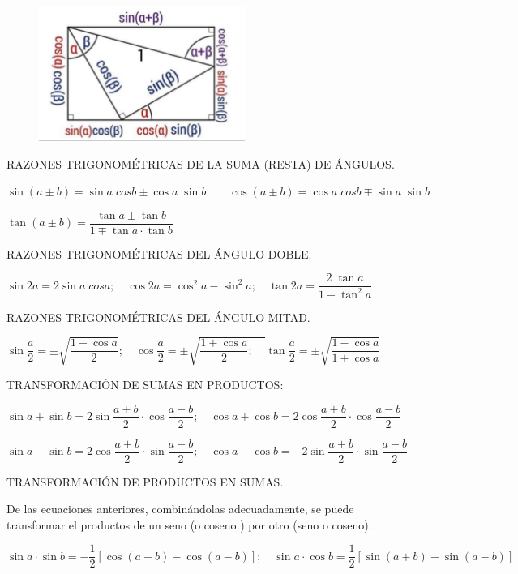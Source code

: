 	\begin{figure}[H]
		\centering
		\includegraphics[width=0.6\textwidth]{imagenes/apendices/APENDICESIM10.png}
	\end{figure}



	RAZONES TRIGONOMÉTRICAS DE LA SUMA (RESTA) DE ÁNGULOS.
	
	$\sin(a \pm b)=\sin a \; cos b \pm \cos a \; \sin b \qquad \cos(a \pm b)= \cos a \; cos b \mp \sin a \; \sin b$
	
	$\tan (a\pm b) = \dfrac {\tan a \pm \tan b}{1 \mp \tan a \cdot \tan b}$
	
	RAZONES TRIGONOMÉTRICAS DEL ÁNGULO DOBLE.
	
	$\sin 2a = 2 \sin a \; cos a ; \quad \cos 2a =\cos^2 a - \sin^2 a ; \quad \tan 2a = \dfrac {2 \; \tan a}{1-\tan^2 a}$
	
	RAZONES TRIGONOMÉTRICAS DEL ÁNGULO MITAD.
	
	$\sin \dfrac a 2 = \pm \sqrt{ \dfrac {1-\cos a}{2}} ; \quad \cos \dfrac a 2 = \pm \sqrt{ \dfrac {1+\cos a}{2} ; \quad }\tan \dfrac a 2 = \pm \sqrt{\dfrac {1-\cos a}{1+\cos a}}$
	
	TRANSFORMACIÓN DE SUMAS EN PRODUCTOS:
	
	$\sin a + \sin b = 2 \sin \dfrac {a+b}{2}\cdot \cos \dfrac {a-b}{2}  ; 	\quad  \cos a + \cos b = 2 \cos \dfrac {a+b}{2}\cdot \cos \dfrac {a-b}{2}$
	
	$\sin a - \sin b = 2 \cos \dfrac {a+b}{2}\cdot \sin \dfrac {a-b}{2}  ; 	\quad  \cos a - \cos b = -2 \sin \dfrac {a+b}{2}\cdot \sin \dfrac {a-b}{2}$
	
	TRANSFORMACIÓN DE PRODUCTOS EN SUMAS.
	
	De las ecuaciones anteriores, combinándolas adecuadamente, se puede transformar el productos de un seno (o coseno ) por otro (seno o coseno).
	
	$\sin a \cdot \sin b= -\dfrac 1 2 [\cos(a+b)-\cos(a-b)]; \quad \sin a \cdot \cos b= \dfrac 1 2 [\sin(a+b)+\sin(a-b)]$
	
